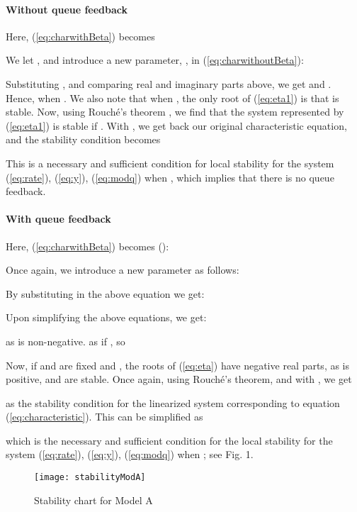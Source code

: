 \documentclass[conference]{IEEEtran}
\begin{document}
\paragraph{Without queue feedback}
Here, (\ref{eq:charwithBeta}) becomes


We let , and introduce a new parameter, , in (\ref{eq:charwithoutBeta}):


Substituting , and comparing real and imaginary parts above, we get  and . Hence,  when . We also note that when , the only root of 
(\ref{eq:eta1}) is  that is stable. Now, using Rouch\'{e}'s theorem 
\cite{lang}, we find that the system represented by 
(\ref{eq:eta1}) is stable if . 
With , we get back our original characteristic equation, and the stability condition becomes  


This is a 
necessary and sufficient condition for local stability for the system  
(\ref{eq:rate}), (\ref{eq:y}), (\ref{eq:modq}) when , which implies that there 
is no queue feedback.

\paragraph{With queue feedback}
Here, (\ref{eq:charwithBeta}) becomes ():

 

Once again, we introduce a new parameter  as follows:


By substituting  in the above equation we get:


Upon simplifying the above equations, we get:

as  is non-negative.  as 
 if , so


Now, if  and  are fixed and , the roots of (\ref{eq:eta}) have negative real parts, as  is positive, and are stable. Once again, using Rouch\'{e}'s theorem, and with , we get

as the stability condition for the linearized system corresponding 
to equation (\ref{eq:characteristic}). This can be simplified as

which is the necessary and sufficient condition for the local stability for the system  
(\ref{eq:rate}), (\ref{eq:y}), (\ref{eq:modq}) when ; see Fig. 1.
\begin{figure}[t!]
\label{stableA}
\centering
{}
\texttt{[image: stabilityModA]}
\caption{Stability chart for Model A}
\end{figure} 
\end{document}
